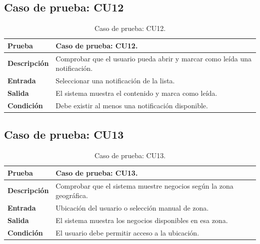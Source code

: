 
\subsection{Caso de prueba: CU12}

\begin{table}[ht]
\centering
\renewcommand{\arraystretch}{1.3}
\begin{tabular}{|p{3cm}|p{12cm}|}
\hline
\rowcolor[RGB]{191,191,191}
\textbf{Prueba} & Caso de prueba: CU12. \\
\hline
\textbf{Descripción} \cellcolor[RGB]{217,217,217} & Comprobar que el usuario pueda abrir y marcar como leída una notificación. \\
\hline
\textbf{Entrada} \cellcolor[RGB]{217,217,217} & Seleccionar una notificación de la lista. \\
\hline
\textbf{Salida} \cellcolor[RGB]{217,217,217} & El sistema muestra el contenido y marca como leída. \\
\hline
\textbf{Condición} \cellcolor[RGB]{217,217,217} & Debe existir al menos una notificación disponible. \\
\hline
\end{tabular}
\caption{Caso de prueba: CU12.}
\label{tab:cu12_black_test}
\end{table}


\subsection{Caso de prueba: CU13}

\begin{table}[ht]
\centering
\renewcommand{\arraystretch}{1.3}
\begin{tabular}{|p{3cm}|p{12cm}|}
\hline
\rowcolor[RGB]{191,191,191}
\textbf{Prueba} & Caso de prueba: CU13. \\
\hline
\textbf{Descripción} \cellcolor[RGB]{217,217,217} & Comprobar que el sistema muestre negocios según la zona geográfica. \\
\hline
\textbf{Entrada} \cellcolor[RGB]{217,217,217} & Ubicación del usuario o selección manual de zona. \\
\hline
\textbf{Salida} \cellcolor[RGB]{217,217,217} & El sistema muestra los negocios disponibles en esa zona. \\
\hline
\textbf{Condición} \cellcolor[RGB]{217,217,217} & El usuario debe permitir acceso a la ubicación. \\
\hline
\end{tabular}
\caption{Caso de prueba: CU13.}
\label{tab:cu13_black_test}
\end{table}

